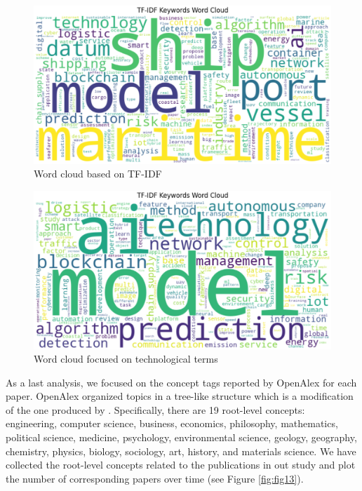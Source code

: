 \documentclass[a4paper, review, endfloat, doubleblind, authoryear]{elsarticle}
\begin{document}
	\begin{figure}[htbp]
		\centering
		\includegraphics[width=\linewidth]{pics/wordcloud_1.eps}
		\caption{Word cloud based on TF-IDF}\label{fig:fig11}
	\end{figure}
	
	\begin{figure}[htbp]
		\centering
		\includegraphics[width=\linewidth]{pics/wordcloud_2.eps}
		\caption{Word cloud focused on technological terms}\label{fig:fig12}
	\end{figure}
	
	As a last analysis, we focused on the concept tags reported by OpenAlex for each paper. OpenAlex organized topics in a tree-like structure which is a modification of the one produced by \citep{shen2018web}. Specifically, there are 19 root-level concepts: engineering, computer science, business, economics, philosophy, mathematics, political science, medicine, psychology, environmental science, geology, geography, chemistry, physics, biology, sociology, art, history, and materials science. We have collected the root-level concepts related to the publications in out study and plot the number of corresponding papers over time (see Figure \ref{fig:fig13}).
	
\end{document}
